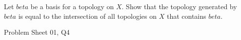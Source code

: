 \begin{samepage}
\begin{ex}
    Let $beta$ be a basis for a topology on $X$. Show that the topology generated by $beta$ is equal to the intersection of all topologies on $X$ that contains $beta$.
\end{ex}
\begin{source}
Problem Sheet 01, Q4
\end{source}
\end{samepage}
